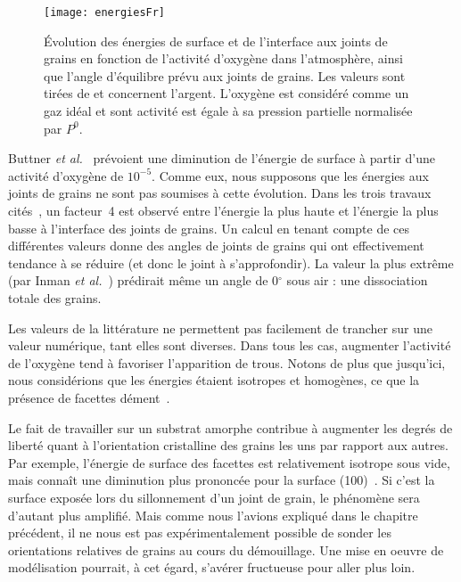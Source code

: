 \begin{figure}[!htb]
\centering
\texttt{[image: energiesFr]}
\caption{Évolution des énergies de surface et de l'interface aux joints de grains en fonction de l'activité d'oxygène dans l'atmosphère, ainsi que l'angle d'équilibre prévu aux joints de grains. Les valeurs sont tirées de \cite{buttner1952adsorption, inman1963interfacial, fiala1975surface, kudrman1969relative} et concernent l'argent. L'oxygène est considéré comme un gaz idéal et sont activité est égale à sa pression partielle normalisée par $P^0$.}
\label{energiesFr}
\end{figure}
Buttner \textit{et al.}~\cite{buttner1952adsorption} prévoient une diminution de l'énergie de surface à partir d'une activité d'oxygène de $10^{-5}$. Comme eux, nous supposons que les énergies aux joints de grains ne sont pas soumises à cette évolution. Dans les trois travaux cités~\cite{inman1963interfacial, fiala1975surface, kudrman1969relative}, un facteur~4 est observé entre l'énergie la plus haute et l'énergie la plus basse à l'interface des joints de grains. Un calcul en tenant compte de ces différentes valeurs donne des angles de joints de grains qui ont effectivement tendance à se réduire (et donc le joint à s'approfondir). La valeur la plus extrême (par Inman \textit{et al.}~\cite{inman1963interfacial}) prédirait même un angle de 0$^\circ$ sous air : une dissociation totale des grains.\par 
Les valeurs de la littérature ne permettent pas facilement de trancher sur une valeur numérique, tant elles sont diverses. Dans tous les cas, augmenter l'activité de l'oxygène tend à favoriser l'apparition de trous. Notons de plus que jusqu'ici, nous considérions que les énergies étaient isotropes et homogènes, ce que la présence de facettes dément~\cite{wulff1901xxv}.\par 
Le fait de travailler sur un substrat amorphe contribue à augmenter les degrés de liberté quant à l'orientation cristalline des grains les uns par rapport aux autres. Par exemple, l'énergie de surface des facettes est relativement isotrope sous vide, mais connaît une diminution plus prononcée pour la surface (100)~\cite{molina2011size}. Si c'est la surface exposée lors du sillonnement d'un joint de grain, le phénomène sera d'autant plus amplifié. Mais comme nous l'avions expliqué dans le chapitre précédent, il ne nous est pas expérimentalement possible de sonder les orientations relatives de grains au cours du démouillage. Une mise en oeuvre de modélisation pourrait, à cet égard, s'avérer fructueuse pour aller plus loin.\par 
